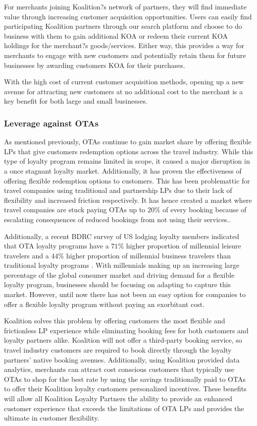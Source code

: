 For merchants joining Koalition?s network of partners, they will find immediate value through increasing customer acquisition opportunities.  Users can easily find participating Koalition partners through our search platform and choose to do business with them to gain additional KOA or redeem their current KOA holdings for the merchant?s goods/services. Either way, this provides a way for merchants to engage with new customers and potentially retain them for future businesses by awarding customers KOA for their purchases. 

With the high cost of current customer acquisition methods, opening up a new avenue for attracting new customers at no additional cost to the merchant is a key benefit for both large and small businesses. 

\subsubsection{Leverage against OTAs}
As mentioned previously, OTAs continue to gain market share by offering flexible LPs that give customers redemption options across the travel industry.  While this type of loyalty program remains limited in scope, it caused a major disruption in a once stagnant loyalty market. Additionally, it has proven the effectiveness of offering flexible redemption options to customers. This has been problemattic for travel companies using traditional and partnership LPs due to their lack of flexibility and increased friction respectively. It has hence created a market where travel companies are stuck paying OTAs up to $20\%$ of every booking because of escalating consequences of reduced bookings from not using their services.. 

Additionally, a recent BDRC survey of US lodging loyalty members indicated that OTA loyalty programs have a $71\%$ higher proportion of millennial leisure travelers and a $44\%$ higher proportion of millennial business travelers than traditional loyalty programs \cite{}.  With millennials making up an increasing large percentage of the global consumer market and driving demand for a flexible loyalty program, businesses should be focusing on adapting to capture this market.  However, until now there has not been an easy option for companies to offer a flexible loyalty program without paying an exorbitant cost.

Koalition solves this problem by offering customers the most flexible and frictionless LP experience while eliminating booking fees for both customers and loyalty partners alike. Koalition will not offer a third-party booking service, so travel industry customers are required to book directly through the loyalty partners' native booking avenues.  Additionally, using Koalition provided data analytics, merchants can attract cost conscious customers that typically use OTAs to shop for the best rate by using the savings traditionally paid to OTAs to offer their Koalition loyalty customers personalized incentives.  These benefits will allow all Koalition Loyalty Partners the ability to provide an enhanced customer experience that exceeds the limitations of OTA LPs and provides the ultimate in customer flexibility.

